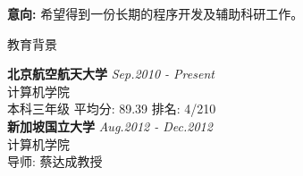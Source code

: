 \documentclass{resume} %
\begin{document}
{\bf 意向: }希望得到一份长期的程序开发及辅助科研工作。


\begin{rSection}{教育背景}

{\bf 北京航空航天大学} \hfill {\em Sep.2010 - Present} \\ 
计算机学院 \\
本科三年级 平均分: 89.39 排名: 4/210\\
{\bf 新加坡国立大学} \hfill {\em Aug.2012 - Dec.2012} \\
计算机学院 \\
导师: 蔡达成教授

\end{rSection}

\end{document}
